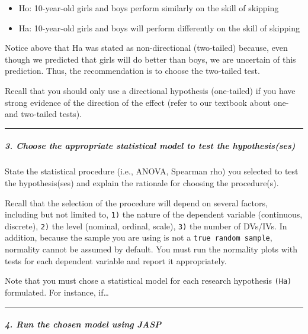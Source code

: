 \documentclass[11pt,]{article}
\providecommand{\tightlist}{%
  \setlength{\itemsep}{0pt}\setlength{\parskip}{0pt}}
\begin{document}
\begin{itemize}
\tightlist
\item
  Ho: 10-year-old girls and boys perform similarly on the skill of
  skipping
\item
  Ha: 10-year-old girls and boys will perform differently on the skill
  of skipping
\end{itemize}

Notice above that Ha was stated as non-directional (two-tailed) because,
even though we predicted that girls will do better than boys, we are
uncertain of this prediction. Thus, the recommendation is to choose the
two-tailed test.

Recall that you should only use a directional hypothesis (one-tailed) if
you have strong evidence of the direction of the effect (refer to our
textbook about one- and two-tailed tests).

\begin{center}\rule{0.5\linewidth}{0.5pt}\end{center}

\hypertarget{choose-the-appropriate-statistical-model-to-test-the-hypothesisses}{%
\subparagraph{3. Choose the appropriate statistical model to test the
hypothesis(ses)}\label{choose-the-appropriate-statistical-model-to-test-the-hypothesisses}}

State the statistical procedure (i.e., ANOVA, Spearman rho) you selected
to test the hypothesis(ses) and explain the rationale for choosing the
procedure(s).

Recall that the selection of the procedure will depend on several
factors, including but not limited to, \texttt{1)} the nature of the
dependent variable (continuous, discrete), \texttt{2)} the level
(nominal, ordinal, scale), \texttt{3)} the number of DVs/IVs. In
addition, because the sample you are using is not a
\texttt{true\ random\ sample}, normality cannot be assumed by default.
You must run the normality plots with tests for each dependent variable
and report it appropriately.

Note that you must chose a statistical model for each research
hypothesis \texttt{(Ha)} formulated. For instance, if\ldots{}

\begin{center}\rule{0.5\linewidth}{0.5pt}\end{center}

\hypertarget{run-the-chosen-model-using-jasp}{%
\subparagraph{4. Run the chosen model using
JASP}\label{run-the-chosen-model-using-jasp}}
\end{document}

